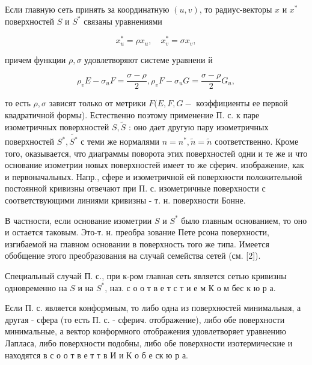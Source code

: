 \documentclass[10pt]{article}
\begin{document}
Если главную сеть принять за координатную $(u, v)$, то радиус-векторы $x$ и $x^{*}$ поверхностей $S$ и $S^{*}$ связаны уравнениями



\[

x_{u}^{*}=\rho x_{u}, \quad x_{v}^{*}=\sigma x_{v},

\]



причем функции $\rho, \sigma$ удовлетворяют системе уравнени й



\[

\rho_{v} E-\sigma_{u} F=\frac{\sigma-\rho}{2}, \rho_{v} F-\sigma_{u} G=\frac{\sigma-\rho}{2} G_{u},

\]



то есть $\rho, \sigma$ зависят только от метрики $F(E, F, G-$ коэффициенты ее первой квадратичной формы). Естественно поэтому применение П. с. к паре изометричных поверхностей $S, \tilde{S}$ : оно дает другую пару изометричных поверхностей $S^{*}, \tilde{S^{*}}$ с теми же нормалями $n=n^{*}, \tilde{n}=\tilde{n}$ соответственно. Кроме того, оказывается, что диаграммы поворота этих поверхностей одни и те же и что основание изометрии новых поверхностей имеет то же сферич. изображение, как и первоначальных. Напр., сфере и изометричной ей поверхности положительной постоянной кривизны отвечают при П. с. изометричные поверхности с соответствующими линиями кривизны - т. н. поверхности Бонне.



В частности, если основание изометрии $S$ и $S^{*}$ было главным основанием, то оно и остается таковым. Это-т. н. преобра зование Пете рсона поверхности, изгибаемой на главном основании в поверхность того же типа. Имеется обобщение этого преобразования на случай семейства сетей (см. [2]).



Специальный случай П. с., при к-ром главная сеть является сетью кривизны одновременно на $S$ и на $S^{*}$, наз. с о о т в е т с т и е м $К$ о м бес к ю р а.



Если П. с. является конформным, то либо одна из поверхностей минимальная, а другая - сфера (то есть П. с. - сферич. отображение), либо обе поверхности минимальные, а вектор конформного отображения удовлетворяет уравнению Лапласа, либо поверхности подобны, либо обе поверхности изотермические и находятся в с о о т в е т т в И и К о б е ск ю р а.
\end{document}
